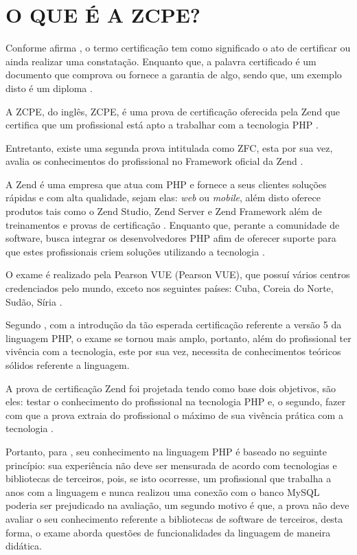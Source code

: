 \chapter{O QUE É A ZCPE?}
\label{zcpe}

Conforme afirma , o termo certificação tem como
significado o ato de certificar ou ainda realizar uma constatação. Enquanto que,
a palavra certificado é um documento que comprova ou fornece
a garantia de algo, sendo que, um exemplo disto é um diploma
\cite{dicionarioEscolar}.

A \acs{ZCPE}, do inglês, \acl{ZCPE}, é uma prova de certificação oferecida
pela Zend que certifica que um profissional está apto a trabalhar com a
tecnologia \acs{PHP} \cite{websiteZendZCPE}.

Entretanto, existe uma segunda prova intitulada como \ac{ZFC},
esta por sua vez, avalia os conhecimentos do profissional no
Framework oficial da Zend \cite{websiteZendZFC}.

A Zend é uma empresa que atua com \acs{PHP} e fornece a seus clientes soluções 
rápidas e com alta qualidade, sejam elas: \textit{web} ou \textit{mobile}, além
disto oferece produtos tais como o \acs{Zend Studio}, \acs{Zend Server} e 
\acs{Zend Framework} além de treinamentos e provas de certificação 
\cite{websiteZendCompany}. Enquanto que, perante a comunidade de software, busca
integrar os desenvolvedores \acs{PHP} afim de oferecer suporte para que estes 
profissionais criem soluções utilizando a tecnologia \cite{websiteZendCompany}.

O exame é realizado pela \acs{Pearson VUE} (\acl{Pearson VUE}), que possuí
vários centros credenciados pelo mundo, exceto nos seguintes países: Cuba,
Coreia do Norte, Sudão, Síria \cite{websiteZendZFC}.

Segundo , com a introdução da tão
esperada certificação referente a versão 5 da linguagem \acs{PHP}, o exame se
tornou mais amplo, portanto, além do profissional ter vivência com a
tecnologia, este por sua vez, necessita de conhecimentos teóricos sólidos
referente a linguagem.

A prova de certificação Zend foi projetada tendo como base dois objetivos, são
eles: testar o conhecimento do profissional na tecnologia \acs{PHP} e, o
segundo, fazer com que a prova extraia do profissional o máximo de sua vivência 
prática com a tecnologia \cite{theZendPHPCertificationPracticeTestBook}.

Portanto, para , seu
conhecimento na linguagem \acs{PHP} é baseado no seguinte princípio: sua
experiência não deve ser mensurada de acordo com tecnologias
e bibliotecas de terceiros, pois, se isto ocorresse, um profissional que
trabalha a anos com a linguagem e nunca realizou uma conexão com o banco 
\acs{MySQL} poderia ser prejudicado na avaliação, um segundo motivo é que, a
prova não deve avaliar o seu conhecimento referente a bibliotecas de software
de terceiros, desta forma, o exame aborda questões de funcionalidades da 
linguagem  de maneira didática.

